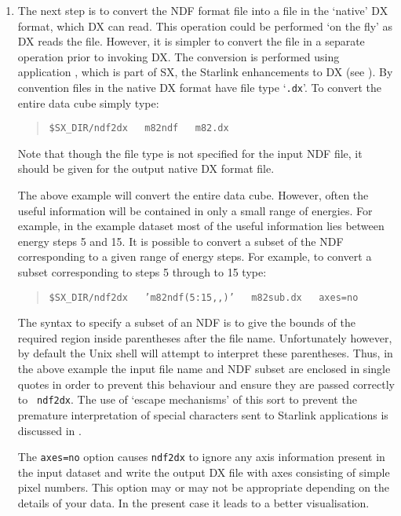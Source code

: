 \begin{enumerate}
  \item The next step is to convert the NDF format file into a file
   in the `native' DX format, which DX can read.  This operation
   could be performed `on the fly' as DX reads the file.  However, it
   is simpler to convert the file in a separate operation prior to
   invoking DX.  The conversion is performed using application
   , which is part of SX, the
   Starlink enhancements to DX (see \cite{SUN203}).
   By convention files in the native DX format have file type `{\tt .dx}'.
   To convert the entire data cube simply type:

  \begin{quote}
   {\tt \$SX\_DIR/ndf2dx ~ m82ndf ~ m82.dx}
  \end{quote}

   Note that though the file type is not specified for the input NDF
   file, it should be given for the output native DX format file.

   The above example will convert the entire data cube.  However, often
   the useful information will be contained in only a small range of
   energies.  For example, in the example dataset most of the
   useful information lies between energy steps 5 and 15.  It is
   possible to convert a subset of the NDF corresponding to a given
   range of energy steps.  For example, to convert a subset
   corresponding to steps 5 through to 15 type:

  \begin{quote}
   {\tt \$SX\_DIR/ndf2dx ~ 'm82ndf(5:15,,)' ~ m82sub.dx ~ axes=no}
  \end{quote}

   The syntax to specify a subset of an NDF is to give the bounds of
   the required region inside parentheses after the file name.  
   Unfortunately however, by default the Unix shell will attempt to
   interpret these parentheses.  Thus, in the above example the input
   file name and NDF subset are enclosed in single quotes in order to
   prevent this behaviour and ensure they are passed correctly to {\tt
   ndf2dx}.  The use of `escape mechanisms'  of this sort to prevent the
   premature interpretation of special characters sent to Starlink
   applications is discussed in \cite{SC4}.

   The {\tt axes=no} option causes {\tt ndf2dx} to ignore any axis
   information present in the input dataset and write the output DX file
   with axes consisting of simple pixel numbers.  This option may or
   may not be appropriate depending on the details of your data.
   In the present case it leads to a better visualisation.


\end{enumerate}
